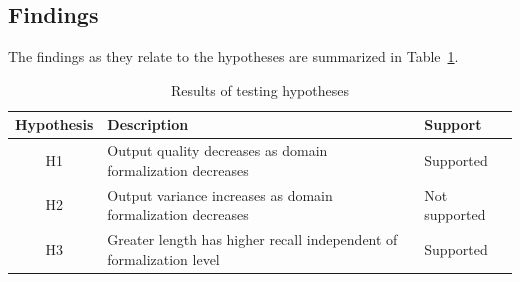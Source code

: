 \documentclass[runningheads]{llncs}
\begin{document}



\subsection{Findings}

The findings as they relate to the hypotheses are summarized in 
Table~\ref{tab:hyp}.

\begin{table}[htbp]
\centering
\caption{Results of testing hypotheses}
\label{tab:hyp}
\setlength{\tabcolsep}{6pt}
\begin{tabular}{c>{\RaggedRight\arraybackslash}p{5.6cm}l}
\toprule
Hypothesis & Description & Support  \\
\midrule
H1 & Output quality decreases as domain formalization decreases & Supported \\
\addlinespace[2pt]
H2 & Output variance increases as domain formalization decreases & Not supported \\
\addlinespace[2pt]
H3 & Greater length has higher recall independent of formalization level & Supported  \\
\bottomrule
\end{tabular}
\end{table}
\end{document}

